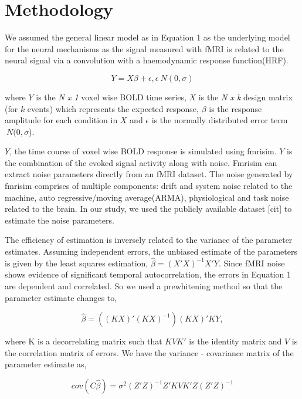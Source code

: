 \documentclass[11pt]{article}
\begin{document}
\section{Methodology}
We assumed the general linear model as in Equation 1 as the underlying model for the neural mechanisms as the signal measured with fMRI is related to the neural signal via a convolution with a haemodynamic response function(HRF).

\begin{equation}
Y=X\beta+ \epsilon,\epsilon ~ N(0,\sigma)
\end{equation}

where $Y$ is the \textit{N x 1} voxel wise BOLD time series, $X$ is the \textit{N x k} design matrix (for $k$ events) which represents the expected response, $\beta$ is the response amplitude for each condition in $X$ and $\epsilon$ is the normally distributed error term $~ N(0,\sigma$).\par

$Y$, the time course of voxel wise BOLD response is simulated using fmrisim. $Y$ is the combination of the evoked signal activity along with noise. Fmrisim can extract noise parameters directly from an fMRI dataset. The noise generated by fmrisim comprises of multiple components: drift and system noise related to the machine, auto regressive/moving average(ARMA), physiological and task noise related to the brain. In our study, we used the publicly available dataset [cit] to estimate the noise parameters.

The efficiency of estimation is inversely related to the variance of the parameter estimates. Assuming independent errors, the unbiased estimate of the parameters is given by the least squares estimation, \(\hat{\beta} = (X' X)^{-1} X' Y \). Since fMRI noise shows evidence of significant temporal autocorrelation, the errors in Equation 1 are dependent and correlated. So we used a prewhitening method so that the parameter estimate changes to,

\begin{equation}
    \hat{\beta} = ((KX)' (KX)^{-1}) (KX)' KY,
\end{equation}

where K is a decorrelating matrix such that \(KVK'\) is the identity matrix and $V$ is the correlation matrix of errors. We have the variance - covariance matrix of the parameter estimate as,

\begin{equation}
    cov(C\hat{\beta}) = \sigma^2 (Z'Z)^{-1} Z'KVK'Z(Z'Z)^{-1}
\end{equation}
\end{document}
